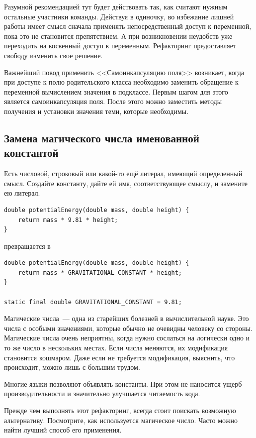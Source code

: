 \documentclass{../../text-style}
\begin{document}
Разумной рекомендацией тут будет действовать так, как считают нужным остальные участники команды. Действуя в одиночку, во избежание лишней работы имеет смысл сначала применять непосредственный доступ к переменной, пока это не становится препятствием. А при возникновении неудобств уже переходить на косвенный доступ к переменным. Рефакторинг предоставляет свободу изменить свое решение.

Важнейший повод применить <<Самоинкапсуляцию поля>> возникает, когда при доступе к полю родительского класса необходимо заменить обращение к переменной вычислением значения в подклассе. Первым шагом для этого является самоинкапсуляция поля. После этого можно заместить методы получения и установки значения теми, которые необходимы.

\subsection{Замена магического числа именованной константой}

Есть числовой, строковый или какой-то ещё литерал, имеющий определенный смысл. Создайте константу, дайте ей имя, соответствующее смыслу, и замените ею литерал.

\begin{verbatim}
double potentialEnergy(double mass, double height) {
    return mass * 9.81 * height;
}
\end{verbatim}

превращается в 

\begin{verbatim}
double potentialEnergy(double mass, double height) {
    return mass * GRAVITATIONAL_CONSTANT * height;
}

static final double GRAVITATIONAL_CONSTANT = 9.81;
\end{verbatim}

Магические числа~--- одна из старейших болезней в вычислительной науке. Это числа с особыми значениями, которые обычно не очевидны человеку со стороны. Магические числа очень неприятны, когда нужно сослаться на логически одно и то же число в нескольких местах. Если числа меняются, их модификация становится кошмаром. Даже если не требуется модификация, выяснить, что происходит, можно лишь с большим трудом.

Многие языки позволяют объявлять константы. При этом не наносится ущерб производительности и значительно улучшается читаемость кода.

Прежде чем выполнять этот рефакторинг, всегда стоит поискать возможную альтернативу. Посмотрите, как используется магическое число. Часто можно найти лучший способ его применения.
\end{document}
